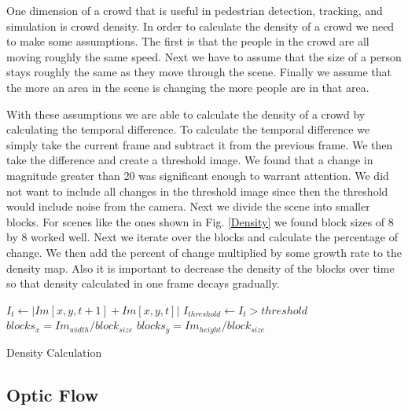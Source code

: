 \documentclass[12pt, onecolumn, conference]{IEEEtran}
\begin{document}
One dimension of a crowd that is useful in pedestrian detection, tracking, and simulation is crowd density. In order to calculate the density of a crowd we need to make some assumptions. The first is that the people in the crowd are all moving roughly the same speed. Next we have to assume that the size of a person stays roughly the same as they move through the scene. Finally we assume that the more an area in the scene is changing the more people are in that area.

With these assumptions we are able to calculate the density of a crowd by calculating the temporal difference. To calculate the temporal difference we simply take the current frame and subtract it from the previous frame. We then take the difference and create a threshold image. We found that a change in magnitude greater than 20 was significant enough to warrant attention. We did not want to include all changes in the threshold image since then the threshold would include noise from the camera. Next we divide the scene into smaller blocks. For scenes like the ones shown in Fig. \ref{Density} we found block sizes of 8 by 8 worked well. Next we iterate over the blocks and calculate the percentage of change. We then add the percent of change multiplied by some growth rate to the density map. Also it is important to decrease the density of the blocks over time so that density calculated in one frame decays gradually.

\begin{algorithm}
\DontPrintSemicolon
 $I_{t} \leftarrow | Im[x, y, t+1] + Im[x, y, t] | $\;
 $I_{threshold} \leftarrow I_{t} > threshold$\;
 $blocks_{x} = Im_{width}/block_{size}$\;
 $blocks_{y} = Im_{height}/block_{size}$\;
\caption{Density Calculation}
\end{algorithm}

\subsection{Optic Flow}
\end{document}
